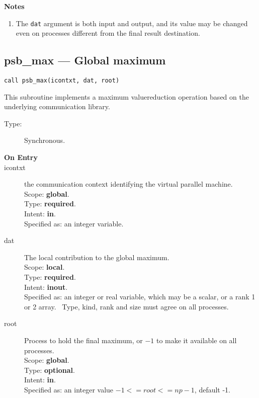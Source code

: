 {\par\noindent\large\bfseries Notes}
\begin{enumerate}
\item The \verb|dat| argument is both input and output, and its
  value may be changed even on processes different from the final
  result destination.
\end{enumerate}



\clearpage\subsection*{psb\_max --- Global maximum}

\begin{verbatim}
call psb_max(icontxt, dat, root)
\end{verbatim}

This subroutine implements a maximum valuereduction
operation based on the underlying communication library. 
\begin{description}
\item[Type:] Synchronous.
\item[\bf  On Entry ]
\item[icontxt] the communication context identifying the virtual
  parallel machine.\\
Scope: {\bf global}.\\
Type: {\bf required}.\\
Intent: {\bf in}.\\
Specified as: an integer variable.
\item[dat] The local contribution to the global maximum.\\
Scope: {\bf local}.\\
Type: {\bf required}.\\
Intent: {\bf inout}.\\
Specified as: an integer or  real variable, which may be a
scalar, or a rank 1 or 2 array. \
Type, kind, rank and size must agree on all processes.
\item[root] Process to hold the final maximum, or $-1$ to make it available
  on all processes.\\
Scope: {\bf global}.\\
Type: {\bf optional}.\\
Intent: {\bf in}.\\
Specified as: an integer value $-1<= root <= np-1$, default -1. \\
\end{description}


